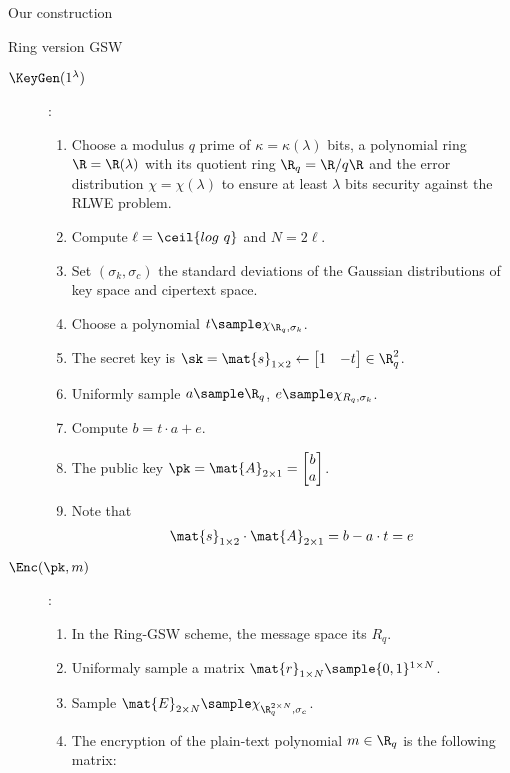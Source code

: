 \begin{section}{Our construction}
  \begin{subsection}{Ring version GSW~\cite{DBLP:journals/tc/KhedrGV16}}
    \begin{description}
    \item[$\KeyGen(1^\lambda)$]:
      \begin{enumerate}
      \item Choose a modulus $q$ prime of $\kappa=\kappa(\lambda)$ bits, a polynomial ring $\R = \R(\lambda)$ with its quotient ring $\R_q = \R/q\R$ and the error distribution $\chi = \chi(\lambda)$ to  ensure at least $\lambda$ bits security against the RLWE problem.
      \item Compute $\ell = \ceil{log~q}$ and $N = 2 \ell$.
      \item Set $(\sigma_k, \sigma_c)$ the standard deviations of the Gaussian distributions of key space and cipertext space.
      \item Choose a polynomial $t \sample \chi_{\R_q, \sigma_k}$.
      \item The secret key is $\sk = \mat{s}_{1 \times 2} \gets \begin{bmatrix}1 & -t\end{bmatrix} \in \R_q^2$.
      \item Uniformly sample $a \sample \R_q$, $e \sample \chi_{R_q, \sigma_k}$.
      \item Compute $b = t \cdot a + e$.
      \item The public key $\pk = \mat{A}_{2 \times 1} = \begin{bmatrix} b \\ a\end{bmatrix}$.
      \item Note that
        \begin{align*}
          \mat{s}_{1 \times 2} \cdot \mat{A}_{2 \times 1} = b - a \cdot t = e
        \end{align*}
      \end{enumerate}
    \item[$\Enc(\pk, m)$]:
      \begin{enumerate}
      \item In the Ring-GSW scheme, the message space its $R_q$.
      \item Uniformaly sample a matrix $\mat{r}_{1 \times N} \sample \{0,1\}^{1 \times N}$.
      \item Sample $\mat{E}_{2 \times N} \sample \chi_{\R_q^{2 \times  N}, \sigma_c}$.
      \item The encryption of the plain-text polynomial $m \in \R_q$ is the following matrix:

\end{enumerate}
\end{description}
\end{subsection}
\end{section}
